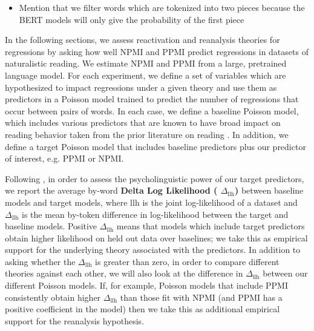 \documentclass[12pt]{article}
\newcommand\llh{$\mathrm{llh}$\xspace}
\newcommand{\dllmath}{\Delta_{\mathrm{llh}}}
\newcommand{\dll}{$\dllmath$\xspace}
\begin{document}
\begin{itemize}
    \item Mention that we filter words which are tokenized into two pieces because the BERT models will only give the probability of the first piece
\end{itemize}

In the following sections, we assess reactivation and reanalysis theories for regressions by asking how well NPMI and PPMI predict regressions in datasets of naturalistic reading. We estimate NPMI and PPMI from a large, pretrained language model. For each experiment, we define a set of variables which are hypothesized to impact regressions under a given theory and use them as predictors in a Poisson model trained to predict the number of regressions that occur between pairs of words. In each case, we define a baseline Poisson model, which includes various predictors that are known to have broad impact on reading behavior taken from the prior literature on reading \citep{frank2011insensitivity, smith2013effect, goodkind2018predictive, wilcox2020predictive}. In addition, we define a target Poisson model that includes baseline predictors plus our predictor of interest, e.g. PPMI or NPMI. 

Following \citet{goodkind2018predictive}, in order to assess the psycholinguistic power of our target predictors, we report the average by-word \textbf{Delta Log Likelihood ( \dll)} between baseline models and target models, where \llh is the joint log-likelihood of a dataset and \dll is the mean by-token difference in log-likelihood between the target and baseline models. Positive \dll means that models which include target predictors obtain higher likelihood on held out data over baselines; we take this as empirical support for the underlying theory associated with the predictors. In addition to asking whether the \dll is greater than zero, in order to compare different theories against each other, we  will also look at the difference in \dll between our different Poisson models. If, for example, Poisson models that include PPMI consistently obtain higher \dll than those fit with NPMI (and PPMI has a positive coefficient in the model) then we take this as additional empirical support for the reanalysis hypothesis.
\end{document}
